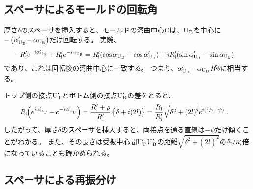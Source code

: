 \subsection{スペーサによるモールドの回転角}
厚さ$\delta$のスペーサを挿入すると、モールドの湾曲中心Oは、U$_\text B$を中心に$-\left(\alpha'_{\text U_\text B}\!-\alpha_{\text U_\text B}\right)$だけ回転する。
実際、
\begin{align*}
  -R_\text i'e^{-i\alpha'_{\text U_\text B}}+R_\text i'e^{-i\alpha_{\text U_\text B}}
  &= R_\text i'(\cos\alpha_{\text U_\text B}-\cos\alpha'_{\text U_\text B})+iR_\text i'(\sin\alpha'_{\text U_\text B}-\sin\alpha_{\text U_\text B})
\end{align*}
であり、これは回転後の湾曲中心に一致する。
つまり、$\alpha'_{\text U_\text B}\!-\alpha_{\text U_\text B}$が$\theta$に相当する。
\begin{hosokubox}
トップ側の接点U$_\text T'$とボトム側の接点U$_\text B'$の差をとると、
\begin{align*}
  R_\text i\!\left(e^{i\alpha_{\text U_\text T}'}-e^{-i\alpha'_{\text U_\text B}}\right)
  &= \frac{R_\text i'+\rho}{R_\text i'}\left\{\delta+i(2\bar l)\right\}
   = \frac{R_\text i}{R_\text i'}\sqrt{\delta^2+(2\bar l)^2}e^{i(\nicefrac\pi2-\psi)}\ .
\end{align*}
したがって、厚さ$\delta$のスペーサを挿入すると、両接点を通る直線は$-\psi$だけ傾くことがわかる。
また、その長さは受板中心間U$_\text T'$U$_\text B'$の距離$\sqrt{\delta^2+(2\bar l)^2}$の$\nicefrac{R_i}{R_i'}$倍になっていることも確かめられる。
\end{hosokubox}


\subsection{スペーサによる再振分け}


